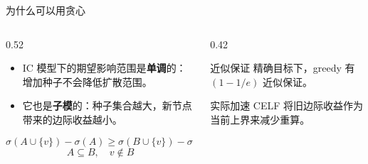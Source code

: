 \documentclass[UTF8, 10pt, aspectratio=169]{ctexbeamer}
\newcommand{\metricbox}[2]{%
    \begin{block}{#1}
        \centering\Large #2
    \end{block}
}
\begin{document}
\begin{frame}{为什么可以用贪心}
    \begin{columns}[T,onlytextwidth]
        \begin{column}{0.52\linewidth}
            \begin{itemize}
                \item IC 模型下的期望影响范围是\textbf{单调}的：增加种子不会降低扩散范围。
                \item 它也是\textbf{子模}的：种子集合越大，新节点带来的边际收益越小。
            \end{itemize}
            \[
                \sigma(A\cup\{v\})-\sigma(A)
                \geq
                \sigma(B\cup\{v\})-\sigma(B)
            \]
            \[
                A\subseteq B,\quad v\notin B
            \]
        \end{column}
        \begin{column}{0.42\linewidth}
            \metricbox{近似保证}{精确目标下，greedy 有 $(1-1/e)$ 近似保证。}
            \metricbox{实际加速}{CELF 将旧边际收益作为当前上界来减少重算。}
        \end{column}
    \end{columns}
\end{frame}
\end{document}
